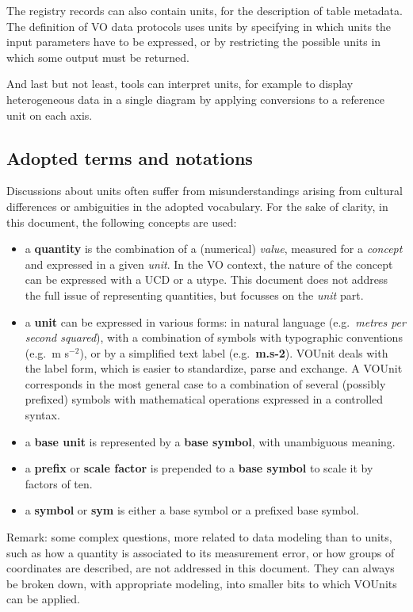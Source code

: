\documentclass[11pt,notitlepage,onecolumn]{ivoa}
\def\eg{e.g.~}
\newcommand{\unit}[1]{\textbf{\textsf{\color{orange}#1}}}
\begin{document}
The registry records can also contain units, for the description of table metadata.
The definition of VO data protocols uses units by specifying in which units the input
parameters have to be expressed, or by restricting the possible units in which some 
output must be returned.

And last but not least, tools can interpret units, for example to display
heterogeneous data in a single diagram by applying conversions to a reference 
unit on each axis.

\subsection{Adopted terms and notations\label{sec:notations}}

Discussions about units often suffer from misunderstandings arising from cultural
differences or ambiguities in the adopted vocabulary. For the sake of clarity, in this 
document, the following concepts are used:

\begin{itemize}
\item a {\bf quantity} is the combination of a (numerical) {\em value}, measured for a {\em concept} and expressed in a given {\em unit}. 
In the VO context, the nature of the concept can be expressed with a UCD or a utype. This document does not address the full issue of
representing quantities, but focusses on the {\em unit} part.
\item a {\bf unit} can be expressed in various forms: in natural language (\eg \emph{metres per second squared}), with a combination
of symbols with typographic conventions (\eg m s$^{-2}$), or by a simplified text label (\eg \unit{m.s-2}). VOUnit deals with the
label form, which is easier to standardize, parse and exchange. A VOUnit corresponds in the most general case to a combination of
several (possibly prefixed) symbols with mathematical operations expressed in a controlled syntax.
\item a {\bf base unit} is represented by a {\bf base symbol}, with unambiguous meaning.
\item a {\bf prefix} or {\bf scale factor} is prepended to a {\bf base symbol} to scale it by factors of ten.
\item a {\bf symbol} or \unit{sym} is either a base symbol or a prefixed base symbol.
\end{itemize}

Remark: some complex questions, more related to data modeling than to units, such as how a quantity 
is associated to its measurement error, or how groups of coordinates are described, are not addressed in this
document. They can always be broken down, with appropriate modeling, into smaller bits to which VOUnits can
be applied.
\end{document}
